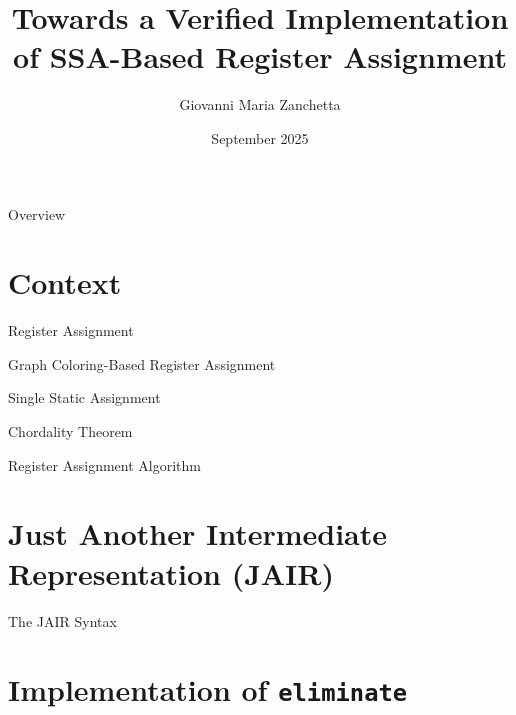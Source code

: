 \documentclass[aspectratio=169,xcolor=dvipsnames]{beamer}
\title{Towards a Verified Implementation of SSA-Based Register Assignment}
\author{Giovanni Maria Zanchetta}
\institute
{
    Advisor: Prof. Marco Patrignani \\
    Co-Advisor: Matthis Kruse \\
}
\date{September 2025}
\begin{document}
\begin{frame}
    \titlepage
\end{frame}

\begin{frame}{Overview}
    \tableofcontents
\end{frame}

\section{Context}
\begin{frame}{Register Assignment}

\end{frame}

\begin{frame}{Graph Coloring-Based Register Assignment}

\end{frame}

\begin{frame}{Single Static Assignment}

\end{frame}

\begin{frame}{Chordality Theorem}

\end{frame}

\begin{frame}{Register Assignment Algorithm}

\end{frame}

\section{Just Another Intermediate Representation (JAIR)}

\begin{frame}{The JAIR Syntax}

\end{frame}

\section{Implementation of \texttt{eliminate}}
\end{document}
